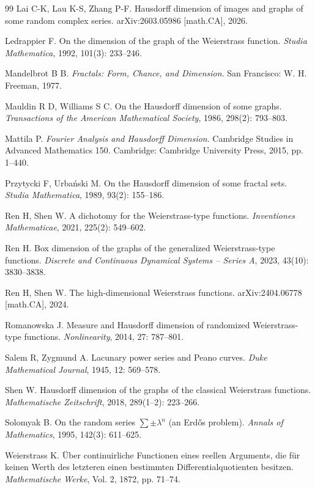 \documentclass[12pt, reqno]{amsart}
\theoremstyle{plain}
\theoremstyle{definition}
\theoremstyle{remark}
\begin{document}
\begin{thebibliography}{99}
	Lai C-K, Lau K-S, Zhang P-F. Hausdorff dimension of images and graphs of some random complex series. arXiv:2603.05986 [math.CA], 2026.
	
	Ledrappier F. On the dimension of the graph of the Weierstrass function.
	\textit{Studia Mathematica}, 1992, 101(3): 233--246.
	
	Mandelbrot B B. \textit{Fractals: Form, Chance, and Dimension}.
	San Francisco: W. H. Freeman, 1977.
	
	Mauldin R D, Williams S C. On the Hausdorff dimension of some graphs.
	\textit{Transactions of the American Mathematical Society}, 1986, 298(2): 793--803.
	
	Mattila P. \textit{Fourier Analysis and Hausdorff Dimension}.
	Cambridge Studies in Advanced Mathematics 150. Cambridge: Cambridge University Press, 2015, pp. 1--440.
	
	Przytycki F, Urbański M. On the Hausdorff dimension of some fractal sets.
	\textit{Studia Mathematica}, 1989, 93(2): 155--186.
	
	Ren H, Shen W. A dichotomy for the Weierstrass-type functions.
	\textit{Inventiones Mathematicae}, 2021, 225(2): 549--602.
	
	Ren H. Box dimension of the graphs of the generalized Weierstrass-type functions.
	\textit{Discrete and Continuous Dynamical Systems -- Series A}, 2023, 43(10): 3830--3838.
	
	Ren H, Shen W. The high-dimensional Weierstrass functions. arXiv:2404.06778 [math.CA], 2024.
	
	Romanowska J. Measure and Hausdorff dimension of randomized Weierstrass-type functions. \textit{Nonlinearity}, 2014, 27: 787--801.
	
	Salem R, Zygmund A. Lacunary power series and Peano curves.
	\textit{Duke Mathematical Journal}, 1945, 12: 569--578.
	
	Shen W. Hausdorff dimension of the graphs of the classical Weierstrass functions.
	\textit{Mathematische Zeitschrift}, 2018, 289(1--2): 223--266.
	
	Solomyak B. On the random series $\sum \pm\lambda^n$ (an Erdős problem).
	\textit{Annals of Mathematics}, 1995, 142(3): 611--625.
	
	Weierstrass K. Über continuirliche Functionen eines reellen Arguments, die für keinen Werth des letzteren einen bestimmten Differentialquotienten besitzen.
	\textit{Mathematische Werke}, Vol. 2, 1872, pp. 71--74.
	
\end{thebibliography}
	
\end{document}
